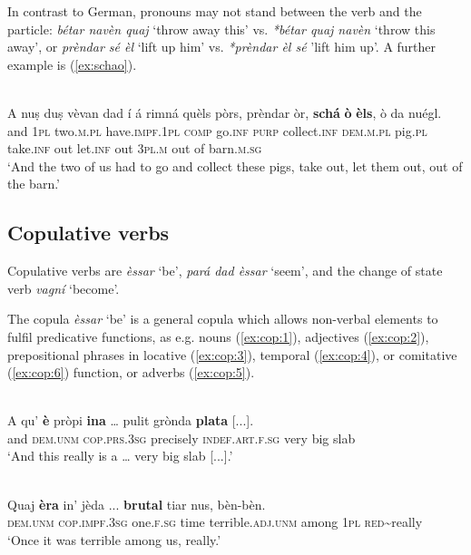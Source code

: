 In contrast to German, pronouns may not stand between the verb and the particle: \textit{bétar navèn quaj} `throw away this' vs. \textit{*bétar quaj navèn} `throw this away', or \textit{prèndar sé èl} `lift up him' vs. \textit{*prèndar èl sé} 'lift him up'. A further example is (\ref{ex:schao}).

\ea
\label{ex:schao}
\\
	\gll    A nuṣ duṣ vèvan dad í á rimná quèls pòrs, prèndar òr, \textbf{schá} \textbf{ò} \textbf{èls}, ò da nuégl.\\
	and \textsc{1pl} two.\textsc{m.pl} have.\textsc{impf.1pl} \textsc{comp} go.\textsc{inf}  \textsc{purp} collect.\textsc{inf} \textsc{dem.m.pl} pig.\textsc{pl} take.\textsc{inf} out  let.\textsc{inf} out \textsc{3pl.m} out of barn.\textsc{m.sg}\\
\glt `And the two of us had to go and collect these pigs, take out, let them out, out of the barn.'
\z


\subsection{Copulative verbs}
Copulative verbs are \textit{èssar} `be', \textit{pará dad èssar} `seem', and the change of state verb \textit{vagní} `become'.

The copula \textit{èssar} `be' is a general copula which allows non-verbal elements to fulfil predicative functions, as e.g. nouns (\ref{ex:cop:1}), adjectives (\ref{ex:cop:2}), prepositional phrases in locative (\ref{ex:cop:3}), temporal (\ref{ex:cop:4}), or comitative (\ref{ex:cop:6}) function, or adverbs (\ref{ex:cop:5}).

\ea
\label{ex:cop:1}
\\
	\gll    A qu’ \textbf{è} pròpi \textbf{ina} … pulit grònda \textbf{plata} [...].\\
	and \textsc{dem.unm} \textsc{cop.prs.3sg} precisely \textsc{indef.art.f.sg} {} very big slab\\
\glt `And this really is a … very big slab [...].'
\z

\ea
\label{ex:cop:2}
\\
\gll Quaj \textbf{èra} in’ jèda ... \textbf{brutal} tiar nus, bèn-bèn.\\
\textsc{dem.unm} \textsc{cop.impf.3sg} one.\textsc{f.sg} time {} terrible.\textsc{adj.unm} among \textsc{1pl} \textsc{red}\textasciitilde{really}\\
\glt `Once it was terrible among us, really.'
\z

